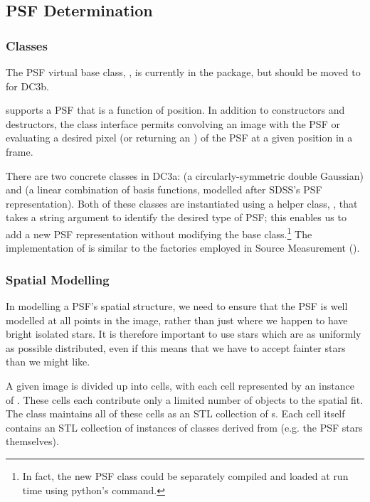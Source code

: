 
\subsection{PSF Determination}
\label{secPsf}

\subsubsection{Classes}

The PSF virtual base class, , is currently in the
 package, but should be moved
to  for DC3b.

 supports a PSF that is a function of position.  
In addition to constructors and destructors, the class interface
permits convolving an image with the PSF or evaluating a desired
pixel (or returning an ) of the PSF at a given position in a frame.

There are two concrete  classes in DC3a:  (a circularly-symmetric double Gaussian) and
 (a linear combination of basis functions, modelled after SDSS's PSF representation).  Both of these
classes are instantiated using a helper class, , that takes a string argument to identify the desired
type of PSF; this enables us to add a new PSF representation without modifying the base class.\footnote{In fact, the new
  PSF class could be separately compiled and loaded at run time using python's  command.}  The implementation of  is similar to the factories employed in Source Measurement ().

\subsubsection{Spatial Modelling}

In modelling a PSF's spatial structure, we need to ensure that the PSF is well modelled at all
points in the image, rather than just where we happen to have bright isolated stars.  It is
therefore important to use stars which are as uniformly as possible distributed, even if this
means that we have to accept fainter stars than we might like.

A given image is divided up into cells, with each cell represented by an instance of . These cells
each contribute only a limited number of objects to the spatial fit.  The  class maintains all of
these cells as an STL collection of s.  Each cell itself contains an STL collection of instances of
classes derived from  (e.g. the PSF stars themselves).


